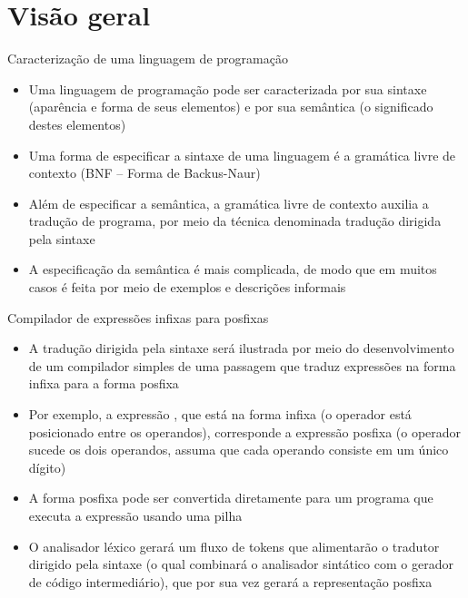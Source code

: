 \section{Visão geral}

\begin{frame}[fragile]{Caracterização de uma linguagem de programação}

    \begin{itemize}
        \item Uma linguagem de programação pode ser caracterizada por sua sintaxe (aparência e forma de seus elementos) e por sua semântica (o significado destes
            elementos)
        \pause

        \item Uma forma de especificar a sintaxe de uma linguagem é a gramática livre de contexto (BNF -- Forma de Backus-Naur)
        \pause

        \item Além de especificar a semântica, a gramática livre de contexto auxilia a tradução de programa, por meio da técnica denominada tradução dirigida
            pela sintaxe
        \pause

        \item A especificação da semântica é mais complicada, de modo que em muitos casos é feita por meio de exemplos e descrições informais
    \end{itemize}

\end{frame}

\begin{frame}[fragile]{Compilador de expressões infixas para posfixas}

    \begin{itemize}
        \item A tradução dirigida pela sintaxe será ilustrada por meio do desenvolvimento de um compilador simples de uma passagem que traduz expressões
            na forma infixa para a forma posfixa
        \pause

        \item Por exemplo, a expressão , que está na forma infixa (o operador está posicionado entre os operandos), corresponde a expressão
            posfixa  (o operador sucede os dois operandos, assuma que cada operando consiste em um único dígito)
        \pause

        \item A forma posfixa pode ser convertida diretamente para um programa que executa a expressão usando uma pilha
        \pause

        \item O analisador léxico gerará um fluxo de tokens que alimentarão o tradutor dirigido pela sintaxe (o qual combinará o analisador sintático com o gerador
            de código intermediário), que por sua vez gerará a representação posfixa
    \end{itemize}

\end{frame}

